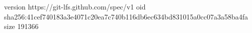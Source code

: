 version https://git-lfs.github.com/spec/v1
oid sha256:41cef740183a3e4071c20ea7c740b116db6ec634bd831015a0cc07a3a58ba4fa
size 191366

